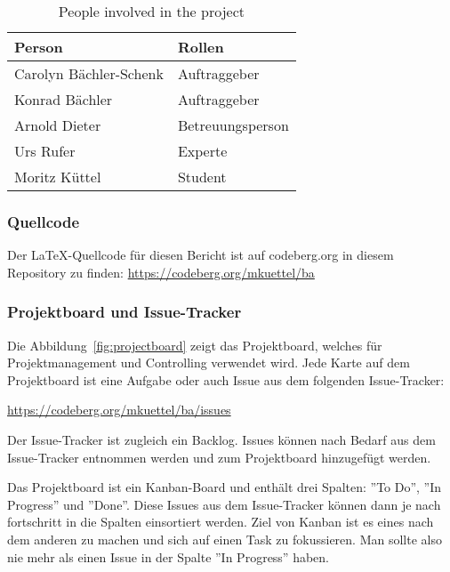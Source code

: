 \begin{table}[H]
    \begin{tabular}{l p{3.2cm}}
        \toprule
        \bfseries Person   & \bfseries Rollen \\
        \midrule
        Carolyn Bächler-Schenk    & Auftraggeber \\
        \midrule
        Konrad Bächler     & Auftraggeber \\
        \midrule
        Arnold Dieter      & Betreuungsperson \\
        \midrule
        Urs Rufer          & Experte \\
        \midrule
        Moritz Küttel      & Student \\
        \bottomrule
    \end{tabular}
    \caption{People involved in the project}\label{tab:projectmembers}
\end{table}

\subsubsection{Quellcode}

Der \LaTeX-Quellcode für diesen Bericht ist auf codeberg.org in diesem Repository zu finden:
\url{https://codeberg.org/mkuettel/ba}


\subsubsection{Projektboard und Issue-Tracker}

Die Abbildung~\ref{fig:projectboard} zeigt das Projektboard, welches für Projektmanagement und Controlling verwendet wird.
Jede Karte auf dem Projektboard ist eine Aufgabe oder auch Issue aus dem folgenden Issue-Tracker:

\url{https://codeberg.org/mkuettel/ba/issues}

Der Issue-Tracker ist zugleich ein Backlog. Issues können nach Bedarf aus dem Issue-Tracker entnommen werden und zum Projektboard hinzugefügt werden.

Das Projektboard ist ein Kanban-Board und enthält drei Spalten: ''To Do'', ''In Progress'' und ''Done''.
Diese Issues aus dem Issue-Tracker können dann je nach fortschritt in die Spalten einsortiert werden. 
Ziel von Kanban ist es eines nach dem anderen zu machen und sich auf einen Task zu fokussieren. Man sollte also nie mehr als einen Issue in der Spalte ''In Progress'' haben.

